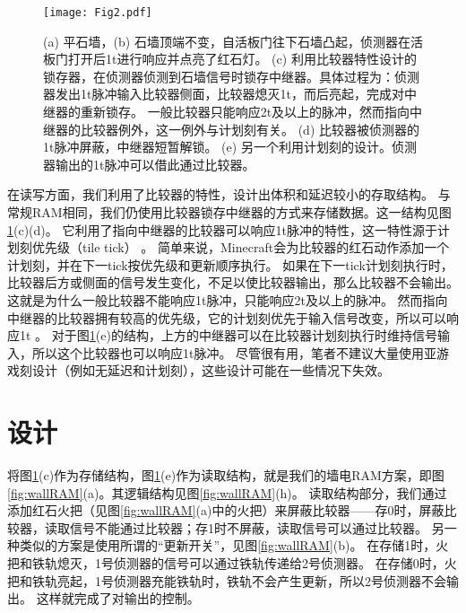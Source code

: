 \documentclass[UTF8,12pt,punct=kaiming,fontset=none]{ctexart}
\newcommand*{\upcite}[1]{
    \textsuperscript{\cite{#1}}
}
\begin{document}
\begin{figure}[t]
    \centering
    \texttt{[image: Fig2.pdf]}
    \caption{\small (a) 平石墙，(b) 石墙顶端不变，自活板门往下石墙凸起，侦测器在活板门打开后1t进行响应并点亮了红石灯。
    (c) 利用比较器特性设计的锁存器，在侦测器侦测到石墙信号时锁存中继器。具体过程为：侦测器发出1t脉冲输入比较器侧面，比较器熄灭1t，而后亮起，完成对中继器的重新锁存。
    一般比较器只能响应2t及以上的脉冲，然而指向中继器的比较器例外，这一例外与计划刻有关。
    (d) 比较器被侦测器的1t脉冲屏蔽，中继器短暂解锁。
    (e) 另一个利用计划刻的设计。侦测器输出的1t脉冲可以借此通过比较器。}
    \label{fig:wall}
\end{figure}

在读写方面，我们利用了比较器的特性，设计出体积和延迟较小的存取结构。
与常规RAM相同，我们仍使用比较器锁存中继器的方式来存储数据。这一结构见图\ref{fig:wall}(c)(d)。
它利用了指向中继器的比较器可以响应1t脉冲的特性，这一特性源于计划刻优先级（tile tick）\upcite{TileTick}。
简单来说，Minecraft会为比较器的红石动作添加一个计划刻，并在下一tick按优先级和更新顺序执行。
如果在下一tick计划刻执行时，比较器后方或侧面的信号发生变化，不足以使比较器输出，那么比较器不会输出。这就是为什么一般比较器不能响应1t脉冲，只能响应2t及以上的脉冲。
然而指向中继器的比较器拥有较高的优先级，它的计划刻优先于输入信号改变，所以可以响应1t 。
对于图\ref{fig:wall}(e)的结构，上方的中继器可以在比较器计划刻执行时维持信号输入，所以这个比较器也可以响应1t脉冲。
尽管很有用，笔者不建议大量使用亚游戏刻设计（例如无延迟和计划刻），这些设计可能在一些情况下失效。

\section{设计}

将图\ref{fig:wall}(c)作为存储结构，图\ref{fig:wall}(e)作为读取结构，就是我们的墙电RAM方案，即图\ref{fig:wallRAM}(a)。其逻辑结构见图\ref{fig:wallRAM}(h)。
读取结构部分，我们通过添加红石火把（见图\ref{fig:wallRAM}(a)中的火把）来屏蔽比较器——存0时，屏蔽比较器，读取信号不能通过比较器；存1时不屏蔽，读取信号可以通过比较器。
另一种类似的方案是使用所谓的“更新开关”，见图\ref{fig:wallRAM}(b)。
在存储1时，火把和铁轨熄灭，1号侦测器的信号可以通过铁轨传递给2号侦测器。
在存储0时，火把和铁轨亮起，1号侦测器充能铁轨时，铁轨不会产生更新，所以2号侦测器不会输出。
这样就完成了对输出的控制。
\end{document}
